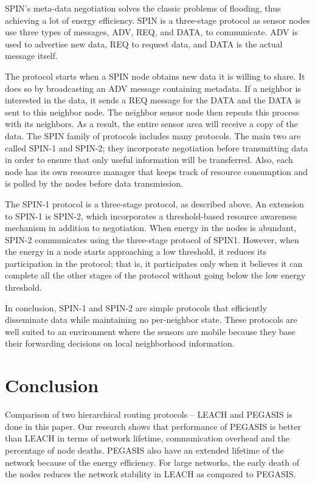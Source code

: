 \documentclass[journal,transmag]{IEEEtran}
\begin{document}
SPIN’s meta-data negotiation solves the classic problems of flooding, thus achieving a lot of energy efficiency. SPIN is a three-stage protocol as sensor nodes use three types of messages, ADV, REQ, and DATA, to communicate. ADV is used to advertise new data, REQ to request data, and DATA is the actual message itself.

The protocol starts when a SPIN node obtains new data it is willing to share. It does so by broadcasting an ADV message containing metadata. If a neighbor is interested in the data, it sends a REQ message for the DATA and the DATA is sent to this neighbor node. The neighbor sensor node then repeats this process with its neighbors. As a result, the entire sensor area will receive a copy of the data. The SPIN family of protocols includes many protocols. The main two are called SPIN-1 and SPIN-2; they incorporate negotiation before transmitting data in order to ensure that only useful information will be transferred. Also, each node has its own resource manager that keeps track of resource consumption and is polled by the nodes before data transmission.

The SPIN-1 protocol is a three-stage protocol, as described above. An extension to SPIN-1 is SPIN-2, which incorporates a threshold-based resource awareness mechanism in addition to negotiation. When energy in the nodes is abundant, SPIN-2 communicates using the three-stage protocol of SPIN1. However, when the energy in a node starts approaching a low threshold, it reduces its participation in the protocol; that is, it participates only when it believes it can complete all the other stages of the protocol without going below the low energy threshold.

In conclusion, SPIN-1 and SPIN-2 are simple protocols that efficiently disseminate data while maintaining no per-neighbor state. These protocols are well suited to an environment where the sensors are mobile because they base their forwarding decisions on local neighborhood information.

\vspace{2em}
\section{Conclusion}

Comparison of two hierarchical routing protocols – LEACH and PEGASIS is done in this paper. Our research shows that performance of PEGASIS is better than LEACH in terms of network lifetime, communication overhead and the percentage of node deaths. PEGASIS also have an extended lifetime of the network because of the energy efficiency. For large networks, the early death of the nodes reduces the network stability in LEACH as compared to PEGASIS.
\end{document}

